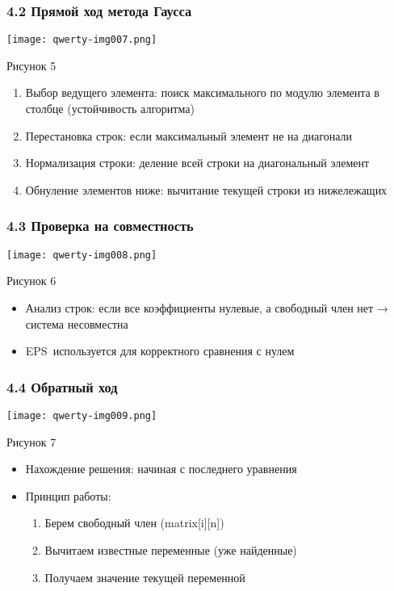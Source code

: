 \documentclass{article}
\begin{document}
\subsubsection{4.2 Прямой ход метода Гаусса}
 \texttt{[image: qwerty-img007.png]} 

Рисунок 5

\begin{enumerate}
\item Выбор ведущего элемента: поиск максимального по модулю элемента в столбце (устойчивость алгоритма)
\item Перестановка строк: если максимальный элемент не на диагонали
\item Нормализация строки: деление всей строки на диагональный элемент
\item Обнуление элементов ниже: вычитание текущей строки из нижележащих
\end{enumerate}
\subsubsection{4.3 Проверка на совместность}
 \texttt{[image: qwerty-img008.png]} 

Рисунок 6

\begin{itemize}
\item Анализ строк: если все коэффициенты нулевые, а свободный член нет → система несовместна
\item EPS используется для корректного сравнения с нулем
\end{itemize}
\subsubsection{4.4 Обратный ход}
 \texttt{[image: qwerty-img009.png]} 

Рисунок 7

\begin{itemize}
\item Нахождение решения: начиная с последнего уравнения
\item Принцип работы:

\begin{enumerate}
\item Берем свободный член (matrix[i][n])
\item Вычитаем известные переменные (уже найденные)
\item Получаем значение текущей переменной
\end{enumerate}
\end{itemize}
\end{document}
